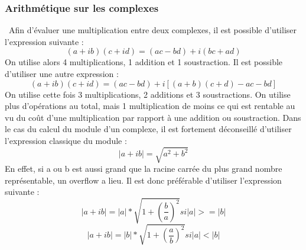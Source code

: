 \documentclass{article}
\begin{document}
\subsubsection{Arithmétique sur les complexes}
\
\indent Afin d'évaluer une multiplication entre deux complexes, il est possible d'utiliser l'expression suivante :
\begin{equation}
    (a + ib)(c + id) = (ac - bd) + i(bc + ad)
\end{equation}
\indent On utilise alors 4 multiplications, 1 addition et 1 soustraction.
Il est possible d'utiliser une autre expression :
\begin{equation}
    (a + ib)(c + id) = (ac - bd) + i[(a + b)(c + d) - ac - bd]
\end{equation}
\indent On utilise cette fois 3 multiplications, 2 additions et 3 soustractions. On utilise plus d'opérations au total, mais 1 multiplication de moins ce qui est rentable au vu du coût d'une multiplication par rapport à une addition ou soustraction.
\medbreak
Dans le cas du calcul du module d'un complexe, il est fortement déconseillé d'utiliser l'expression classique du module :
\begin{equation}
    |a + ib| = \sqrt{a^2 + b^2}
\end{equation}
\indent En effet, si a ou b est aussi grand que la racine carrée du plus grand nombre représentable, un overflow a lieu.
Il est donc préférable d'utiliser l'expression suivante :
\begin{equation}
    |a + ib| = |a|*\sqrt{1 + (\frac{b}{a})^2} si |a| >= |b|
\end{equation}
\begin{equation}
    |a + ib| = |b|*\sqrt{1 + (\frac{a}{b})^2} si |a| < |b|
\end{equation}
\end{document}

